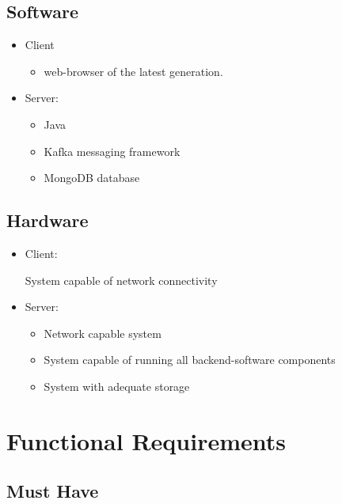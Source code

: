 \documentclass[twoside, english, draft]{Pflichtenheft}
\begin{document}
\subsection{Software}
\begin{itemize}
	\item{Client}
	      \begin{itemize}
		      \item{web-browser of the latest generation.}
	      \end{itemize}

	\item{Server:}
	      \begin{itemize}
		      \item{Java}
		      \item{Kafka messaging framework}
		      \item{MongoDB database}
	      \end{itemize}
\end{itemize}

\subsection{Hardware}
\begin{itemize}
	\item{Client:}
	      \begin{itemize}
		      System capable of network connectivity
	      \end{itemize}

	\item{Server:}
	      \begin{itemize}
		      \item{Network capable system}
		      \item{System capable of running all backend-software components}
		      \item{System with adequate storage}
	      \end{itemize}

\end{itemize}

\section{Functional Requirements}
\subsection{Must Have}
\end{document}
